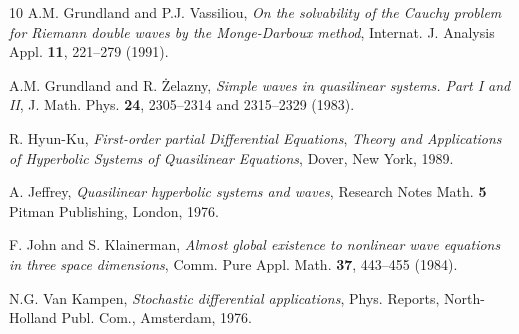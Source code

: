\documentclass{birkjour}
\theoremstyle{definition}
\theoremstyle{remark}
\numberwithin{equation}{section}
\numberwithin{equation}{section}
\numberwithin{thm}{section}
\numberwithin{equation}{section}
\numberwithin{thm}{section}
\begin{document}
\begin{thebibliography}{10}
	A.M. Grundland and P.J.  Vassiliou, {\it  On the solvability of the Cauchy problem for Riemann double waves by the Monge-Darboux method}, Internat. J. Analysis Appl. {\bf 11}, 221--279 (1991).
	
	
	
	A.M. Grundland and R. \.Zelazny, {\it Simple waves in quasilinear systems. Part I and II}, J. Math. Phys. {\bf 24}, 2305--2314 and 2315--2329 (1983).
	
	
	
	R. Hyun-Ku, {\it First-order partial Differential Equations}, {\sl Theory and Applications of Hyperbolic Systems of Quasilinear Equations}, Dover, New York, 1989.
	
	
	
	A. Jeffrey, {\sl Quasilinear hyperbolic systems and waves}, Research Notes Math. {\bf 5} Pitman Publishing, London, 1976. 
	
	F. John and S. Klainerman, {\it  Almost global existence to nonlinear wave equations in three space dimensions}, Comm. Pure Appl. Math. {\bf 37}, 443--455 (1984).
	
	N.G. Van Kampen, {\sl Stochastic differential applications}, Phys. Reports, North-Holland Publ. Com., Amsterdam, 1976.
	
	
	
	

\end{thebibliography}
\end{document}

